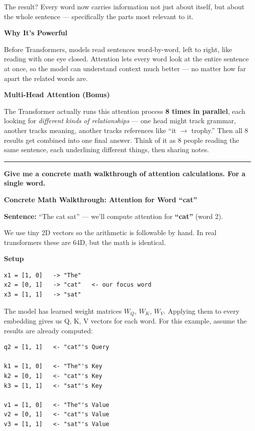 The result? Every word now carries information not just about itself, but about the whole sentence --- specifically the parts most relevant to it.

\medskip
\textbf{Why It's Powerful}

Before Transformers, models read sentences word-by-word, left to right, like reading with one eye closed. Attention lets every word look at the entire sentence at once, so the model can understand context much better --- no matter how far apart the related words are.

\medskip
\textbf{Multi-Head Attention (Bonus)}

The Transformer actually runs this attention process \textbf{8 times in parallel}, each looking for \textit{different kinds of relationships} --- one head might track grammar, another tracks meaning, another tracks references like ``it $\to$ trophy.'' Then all 8 results get combined into one final answer. Think of it as 8 people reading the same sentence, each underlining different things, then sharing notes.

\bigskip
\hrule
\bigskip

\textbf{Give me a concrete math walkthrough of attention calculations. For a single word.}

\medskip

\textbf{Concrete Math Walkthrough: Attention for Word ``cat''}

\textbf{Sentence:} ``The cat sat'' --- we'll compute attention for \textbf{``cat''} (word 2).

We use tiny 2D vectors so the arithmetic is followable by hand. In real transformers these are 64D, but the math is identical.

\medskip
\textbf{Setup}

\begin{verbatim}
x1 = [1, 0]   -> "The"
x2 = [0, 1]   -> "cat"   <- our focus word
x3 = [1, 1]   -> "sat"
\end{verbatim}

The model has learned weight matrices $W_Q$, $W_K$, $W_V$. Applying them to every embedding gives us Q, K, V vectors for each word. For this example, assume the results are already computed:

\begin{verbatim}
q2 = [1, 1]   <- "cat"'s Query

k1 = [1, 0]   <- "The"'s Key
k2 = [0, 1]   <- "cat"'s Key
k3 = [1, 1]   <- "sat"'s Key

v1 = [1, 0]   <- "The"'s Value
v2 = [0, 1]   <- "cat"'s Value
v3 = [1, 1]   <- "sat"'s Value
\end{verbatim}

